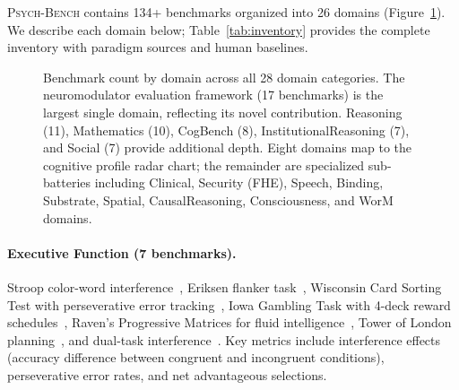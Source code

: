 \documentclass[11pt,letterpaper]{article}
\newcommand{\psychbench}{\textsc{Psych-Bench}}
\begin{document}
\psychbench{} contains 134+ benchmarks organized into 26 domains (Figure~\ref{fig:domain_matrix}). We describe each domain below; Table~\ref{tab:inventory} provides the complete inventory with paradigm sources and human baselines.

\begin{figure}[t]
\centering
{}
\caption{Benchmark count by domain across all 28 domain categories. The neuromodulator evaluation framework (17 benchmarks) is the largest single domain, reflecting its novel contribution. Reasoning (11), Mathematics (10), CogBench (8), InstitutionalReasoning (7), and Social (7) provide additional depth. Eight domains map to the cognitive profile radar chart; the remainder are specialized sub-batteries including Clinical, Security (FHE), Speech, Binding, Substrate, Spatial, CausalReasoning, Consciousness, and WorM domains.}
\label{fig:domain_matrix}
\end{figure}

\paragraph{Executive Function (7 benchmarks).} Stroop color-word interference~\citep{stroop1935interference,macleod1991half}, Eriksen flanker task~\citep{eriksen1974effects}, Wisconsin Card Sorting Test with perseverative error tracking~\citep{berg1948simple}, Iowa Gambling Task with 4-deck reward schedules~\citep{bechara1994insensitivity}, Raven's Progressive Matrices for fluid intelligence~\citep{raven1938progressive}, Tower of London planning~\citep{shallice1982specific}, and dual-task interference~\citep{pashler1994dual}. Key metrics include interference effects (accuracy difference between congruent and incongruent conditions), perseverative error rates, and net advantageous selections.
\end{document}
